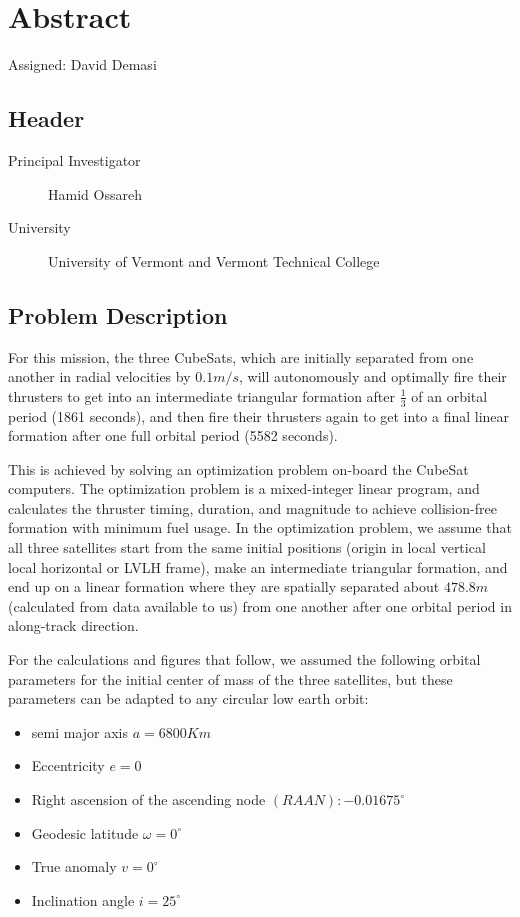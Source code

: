 \section{Abstract}
Assigned: David Demasi \cite{brandon:2008}

\subsection{Header}
\begin{description}
\item[Principal Investigator] Hamid Ossareh
\item[University] University of Vermont and Vermont Technical College
\end{description}

\subsection{Problem Description}
For this mission, the three CubeSats, which are initially separated
from one another in radial velocities by $0.1 m/s$, will autonomously
and optimally fire their thrusters to get into an intermediate
triangular formation after $\frac{1}{3}$ of an orbital period (1861
seconds), and then fire their thrusters again to get into a final
linear formation after one full orbital period (5582 seconds).

This is achieved by solving an optimization problem on-board the
CubeSat computers. The optimization problem is a mixed-integer linear
program, and calculates the thruster timing, duration, and magnitude
to achieve collision-free formation with minimum fuel usage. In the
optimization problem, we assume that all three satellites start from
the same initial positions (origin in local vertical local horizontal
or LVLH frame), make an intermediate triangular formation, and end up
on a linear formation where they are spatially separated about $478.8m$
(calculated from data available to us) from one another after one
orbital period in along-track direction.

For the calculations and figures that follow, we assumed the following
orbital parameters for the initial center of mass of the three
satellites, but these parameters can be adapted to any circular low
earth orbit:

\begin{itemize}
  \item semi major axis $a = 6800 Km$
  \item Eccentricity $e = 0$
  \item Right ascension of the ascending node $(RAAN):-0.01675^{\circ}$
  \item Geodesic latitude $\omega = 0^{\circ}$
  \item True anomaly $v = 0^{\circ}$
  \item Inclination angle $i = 25^{\circ}$
\end{itemize}

